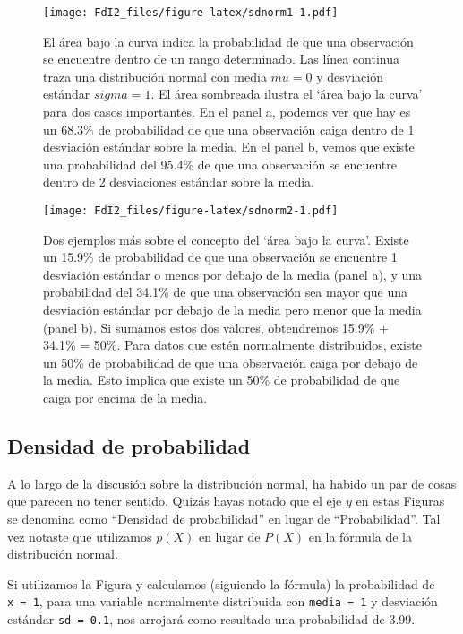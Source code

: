 \documentclass[spanish,]{book}
\begin{document}
\begin{figure}
\centering
\texttt{[image: FdI2\_files/figure-latex/sdnorm1-1.pdf]}
\caption{\label{fig:sdnorm1}El área bajo la curva indica la probabilidad de
que una observación se encuentre dentro de un rango determinado. Las
línea continua traza una distribución normal con media \(mu=0\) y
desviación estándar \(sigma=1\). El área sombreada ilustra el `área bajo
la curva' para dos casos importantes. En el panel a, podemos ver que hay
es un 68.3\% de probabilidad de que una observación caiga dentro de 1
desviación estándar sobre la media. En el panel b, vemos que existe una
probabilidad del 95.4\% de que una observación se encuentre dentro de 2
desviaciones estándar sobre la media.}
\end{figure}

\begin{figure}
\centering
\texttt{[image: FdI2\_files/figure-latex/sdnorm2-1.pdf]}
\caption{\label{fig:sdnorm2}Dos ejemplos más sobre el concepto del `área
bajo la curva'. Existe un 15.9\% de probabilidad de que una observación
se encuentre 1 desviación estándar o menos por debajo de la media (panel
a), y una probabilidad del 34.1\% de que una observación sea mayor que
una desviación estándar por debajo de la media pero menor que la media
(panel b). Si sumamos estos dos valores, obtendremos 15.9\% + 34.1\% =
50\%. Para datos que estén normalmente distribuidos, existe un 50\% de
probabilidad de que una observación caiga por debajo de la media. Esto
implica que existe un 50\% de probabilidad de que caiga por encima de la
media.}
\end{figure}

\subsection{Densidad de probabilidad}\label{density}

A lo largo de la discusión sobre la distribución normal, ha habido un
par de cosas que parecen no tener sentido. Quizás hayas notado que el
eje \(y\) en estas Figuras se denomina como ``Densidad de probabilidad''
en lugar de ``Probabilidad''. Tal vez notaste que utilizamos \(p(X)\) en
lugar de \(P(X)\) en la fórmula de la distribución normal.

Si utilizamos la Figura y calculamos (siguiendo la fórmula) la
probabilidad de \texttt{x\ =\ 1}, para una variable normalmente
distribuida con \texttt{media\ =\ 1} y desviación estándar
\texttt{sd\ =\ 0.1}, nos arrojará como resultado una probabilidad de
3.99.
\end{document}

